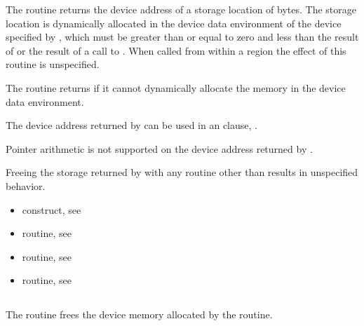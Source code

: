 \effect

The  routine returns the device address of a storage
location of  bytes. The storage location is dynamically allocated in
the device data environment of the device specified by , which
must be greater than or equal to zero and less than the result of
 or the result of a call to
. When called from within a  region 
the effect of this routine is unspecified.

The  routine returns  if it cannot dynamically
allocate the memory in the device data environment. 

The device address returned by  can be used in an 
 clause, .

Pointer arithmetic is not supported on the device address returned by
.

Freeing the storage returned by  with any routine
other than  results in unspecified behavior.

\crossreferences
\begin{itemize}
\item {} construct, see 

\item {} routine, see 

\item {} routine, see 

\item {} routine, see 
\end{itemize}



\pagebreak

\subsection{}
\label{subsec:omp_target_free}
\summary
The  routine frees the device memory allocated by the  routine.

